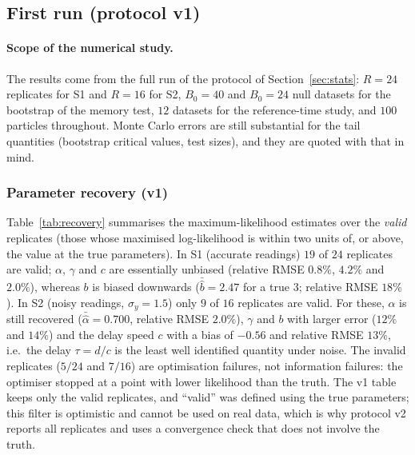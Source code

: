 \documentclass[11pt,a4paper]{article}
\begin{document}
\subsection*{First run (protocol v1)}\label{sec:resv1}
\paragraph{Scope of the numerical study.}
The results come from the full run of the protocol of Section~\ref{sec:stats}: $R=24$ replicates for S1 and $R=16$ for S2, $B_0=40$ and $B_0=24$ null datasets for the bootstrap of the memory test, $12$ datasets for the reference-time study, and $100$ particles throughout. Monte Carlo errors are still substantial for the tail quantities (bootstrap critical values, test sizes), and they are quoted with that in mind.

\subsubsection*{Parameter recovery (v1)}
Table~\ref{tab:recovery} summarises the maximum-likelihood estimates over the \emph{valid} replicates (those whose maximised log-likelihood is within two units of, or above, the value at the true parameters). In S1 (accurate readings) $19$ of $24$ replicates are valid; $\alpha$, $\gamma$ and $c$ are essentially unbiased (relative RMSE $0.8\%$, $4.2\%$ and $2.0\%$), whereas $b$ is biased downwards ($\bar{\hat b}=2.47$ for a true $3$; relative RMSE $18\%$). In S2 (noisy readings, $\sigma_y=1.5$) only $9$ of $16$ replicates are valid. For these, $\alpha$ is still recovered ($\bar{\hat\alpha}=0.700$, relative RMSE $2.0\%$), $\gamma$ and $b$ with larger error ($12\%$ and $14\%$) and the delay speed $c$ with a bias of $-0.56$ and relative RMSE $13\%$, i.e.\ the delay $\tau=d/c$ is the least well identified quantity under noise. The invalid replicates ($5/24$ and $7/16$) are optimisation failures, not information failures: the optimiser stopped at a point with lower likelihood than the truth. The v1 table keeps only the valid replicates, and ``valid'' was defined using the true parameters; this filter is optimistic and cannot be used on real data, which is why protocol v2 reports all replicates and uses a convergence check that does not involve the truth.

\begin{table}[t]
\centering\small

\caption{Recovery of $(\alpha,\gamma,c,b)$ over valid replicates ($19/24$ in S1, $9/16$ in S2). SD: standard deviation of the estimates; RMSE about the truth.}\label{tab:recovery}
\end{table}
\end{document}
